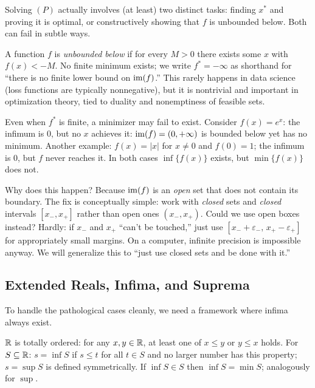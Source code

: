Solving $(P)$ actually involves (at least) two distinct tasks: finding $x^*$ and proving it is optimal, or constructively showing that $f$ is unbounded below.
Both can fail in subtle ways.

\begin{definition}\label{def:unbounded-below}
	A function $f$ is \emph{unbounded below} if for every $M > 0$ there exists some $x$ with $f(x) < -M$. No finite minimum exists; we write $f^* = -\infty$ as shorthand for ``there is no finite lower bound on $\operatorname{im}(f)$.''
	This rarely happens in data science (loss functions are typically nonnegative), but it is nontrivial and important in optimization theory, tied to duality and nonemptiness of feasible sets.
\end{definition}

Even when $f^*$ is finite, a minimizer may fail to exist. Consider $f(x) = e^x$: the infimum is $0$, but no $x$ achieves it: $\operatorname{im}(f) = (0, +\infty)$ is bounded below yet has no minimum. Another example: $f(x) = |x|$ for $x \neq 0$ and $f(0) = 1$; the infimum is $0$, but $f$ never reaches it. In both cases $\inf\{f(x)\}$ exists, but $\min\{f(x)\}$ does not.

Why does this happen? Because $\operatorname{im}(f)$ is an \emph{open} set that does not contain its boundary. The fix is conceptually simple: work with \emph{closed} sets and \emph{closed} intervals $[x_-, x_+]$ rather than open ones $(x_-, x_+)$. Could we use open boxes instead? Hardly: if $x_-$ and $x_+$ ``can't be touched,'' just use $[x_- + \varepsilon_-, \, x_+ - \varepsilon_+]$ for appropriately small margins. On a computer, infinite precision is impossible anyway. We will generalize this to ``just use closed sets and be done with it.''


\subsection{Extended Reals, Infima, and Suprema}\label{sec:extended-reals}

To handle the pathological cases cleanly, we need a framework where infima always exist.

\begin{definition}\label{def:inf-sup}
	$\mathbb{R}$ is totally ordered: for any $x, y \in \mathbb{R}$, at least one of $x \leq y$ or $y \leq x$ holds.
	For $S \subseteq \mathbb{R}$:
	$s = \inf S$ if $s \leq t$ for all $t \in S$ and no larger number has this property;
	$s = \sup S$ is defined symmetrically.
	If $\inf S \in S$ then $\inf S = \min S$; analogously for $\sup$.
\end{definition}

